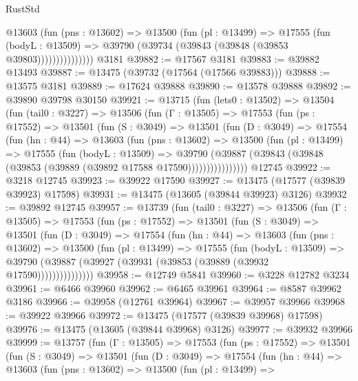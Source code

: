 \begin{lexlean}{RustStd}
\begin{coremodule}
                  @13603
                    (fun (pns : @13602) =>
                    @13500
                      (fun (pl : @13499) =>
                      @17555
                        (fun (bodyL : @13509) =>
                        @39790 (@39734 (@39843 (@39848 (@39853 @39803)))))))))))))))
    @3181
@39882 := @17567 @3181
@39883 := @39882 @13493
@39887 := @13475 (@39732 (@17564 (@17566 @39883)))
@39888 := @13575 @3181
@39889 := @17624 @39888
@39890 := @13578 @39888
@39892 := @39890 @39798 @30150
@39921 := @13715
    (fun (lets0 : @13502) =>
    @13504
      (fun (tail0 : @3227) =>
      @13506
        (fun (Γ : @13505) =>
        @17553
          (fun (ps : @17552) =>
          @13501
            (fun (S : @3049) =>
            @13501
              (fun (D : @3049) =>
              @17554
                (fun (hn : @44) =>
                @13603
                  (fun (pns : @13602) =>
                  @13500
                    (fun (pl : @13499) =>
                    @17555
                      (fun (bodyL : @13509) =>
                      @39790
                        (@39887
                          (@39843 (@39848 (@39853 (@39889 (@39892 @17588 @17590))))))))))))))))
    @12745
@39922 := @3218 @12745
@39923 := @39922 @17590
@39927 := @13475 (@17577 (@39839 @39923) @17598)
@39931 := @13475 (@13605 (@39844 @39923) @3126)
@39932 := @39892 @12745
@39957 := @13739
    (fun (tail0 : @3227) =>
    @13506
      (fun (Γ : @13505) =>
      @17553
        (fun (ps : @17552) =>
        @13501
          (fun (S : @3049) =>
          @13501
            (fun (D : @3049) =>
            @17554
              (fun (hn : @44) =>
              @13603
                (fun (pns : @13602) =>
                @13500
                  (fun (pl : @13499) =>
                  @17555
                    (fun (bodyL : @13509) =>
                    @39790 (@39887 (@39927 (@39931 (@39853 (@39889 (@39932 @17590)))))))))))))))
@39958 := @12749 @5841
@39960 := @3228 @12782 @3234
@39961 := @6466 @39960
@39962 := @6465 @39961
@39964 := @8587 @39962 @3186
@39966 := @39958 (@12761 @39964)
@39967 := @39957 @39966
@39968 := @39922 @39966
@39972 := @13475 (@17577 (@39839 @39968) @17598)
@39976 := @13475 (@13605 (@39844 @39968) @3126)
@39977 := @39932 @39966
@39999 := @13757
    (fun (Γ : @13505) =>
    @17553
      (fun (ps : @17552) =>
      @13501
        (fun (S : @3049) =>
        @13501
          (fun (D : @3049) =>
          @17554
            (fun (hn : @44) =>
            @13603
              (fun (pns : @13602) =>
              @13500
                (fun (pl : @13499) =>

\end{coremodule}
\end{lexlean}
